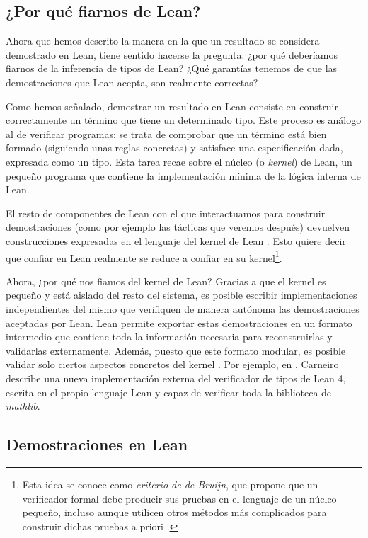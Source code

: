 \documentclass{article}
\begin{document}
\subsection{¿Por qué fiarnos de Lean?}

Ahora que hemos descrito la manera en la que un resultado se considera demostrado en Lean, tiene sentido hacerse la pregunta: ¿por qué deberíamos fiarnos de la inferencia de tipos de Lean? ¿Qué garantías tenemos de que las demostraciones que Lean acepta, son realmente correctas? 

Como hemos señalado, demostrar un resultado en Lean consiste en construir correctamente un término que tiene un determinado tipo. Este proceso es análogo al de verificar programas: se trata de comprobar que un término está bien formado (siguiendo unas reglas concretas) y satisface una especificación dada, expresada como un tipo. Esta tarea recae sobre el núcleo (o \textit{kernel}) de Lean, un pequeño programa que contiene la implementación mínima de la lógica interna de Lean.

El resto de componentes de Lean con el que interactuamos para construir demostraciones (como por ejemplo las tácticas que veremos después) devuelven construcciones expresadas en el lenguaje del kernel de Lean \cite{bailey2024type}. Esto quiere decir que confiar en Lean realmente se reduce a confiar en su kernel\footnote{Esta idea se conoce como \textit{criterio de de Bruijn}, que propone que un verificador formal debe producir sus pruebas en el lenguaje de un núcleo pequeño, incluso aunque utilicen otros métodos más complicados para construir dichas pruebas a priori \cite{bailey2024type}.}.

Ahora, ¿por qué nos fiamos del kernel de Lean? Gracias a que el kernel es pequeño y está aislado del resto del sistema, es posible escribir implementaciones independientes del mismo que verifiquen de manera autónoma las demostraciones aceptadas por Lean. Lean permite exportar estas demostraciones en un formato intermedio que contiene toda la información necesaria para reconstruirlas y validarlas externamente. Además, puesto que este formato modular, es posible validar solo ciertos aspectos concretos del kernel \cite{bailey2024type}. Por ejemplo, en \cite{carneiro2024lean4lean}, Carneiro describe una nueva implementación externa del verificador de tipos de Lean 4, escrita en el propio lenguaje Lean y capaz de verificar toda la biblioteca de \textit{mathlib}.



\subsection{Demostraciones en Lean}
\end{document}
